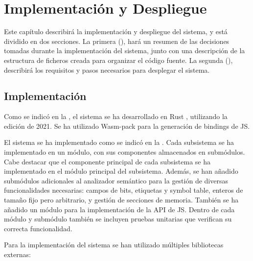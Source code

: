 \chapter{Implementación y Despliegue}\label{chap:implementation}

Este capítulo describirá la implementación y despliegue del sistema, y está
dividido en dos secciones. La primera (), hará un
resumen de las decisiones tomadas durante la implementación del sistema, junto
con una descripción de la estructura de ficheros creada para organizar el código
fuente. La segunda (), describirá los requisitos y pasos
necesarios para desplegar el sistema.

\section{Implementación}\label{sec:implementation}

Como se indicó en la , el sistema se ha desarrollado en
Rust \parencite{Rust}, utilizando la edición de 2021. Se ha utilizado Wasm-pack
\parencite{Wasm-pack} para la generación de \glspl{binding} de \gls{JS}.

El sistema se ha implementado como se indicó en la .
Cada subsistema se ha implementado en un módulo, con sus componentes almacenados
en submódulos. Cabe destacar que el componente principal de cada subsistema se
ha implementado en el módulo principal del subsistema. Además, se han añadido
submódulos adicionales al analizador semántico para la gestión de diversas
funcionalidades necesarias: campos de bits, etiquetas y \gls{symbol table},
enteros de tamaño fijo pero arbitrario, y gestión de secciones de memoria.
También se ha añadido un módulo para la implementación de la \gls{API} de
\gls{JS}. Dentro de cada módulo y submódulo también se incluyen pruebas
unitarias que verifican su correcta funcionalidad.

\noindent
Para la implementación del sistema se han utilizado múltiples bibliotecas
externas:

\newcommand{\libref}[1]{\textit{#1} \parencite{#1}}

